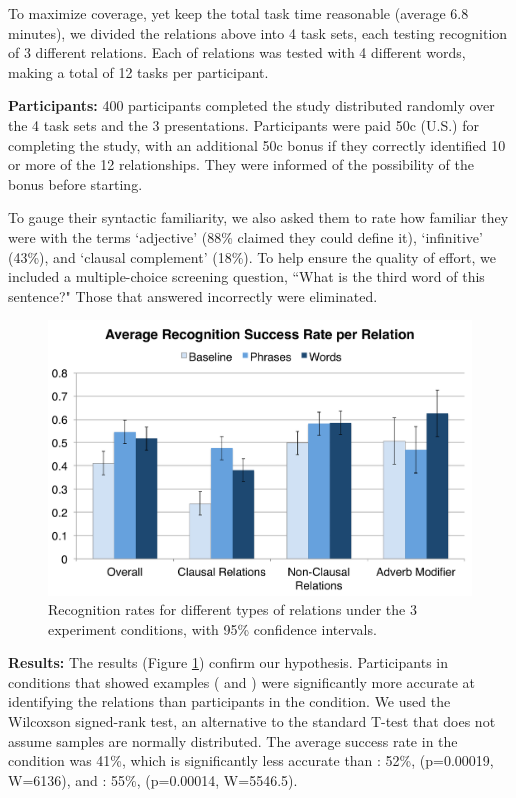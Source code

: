 To maximize coverage, yet keep the total task time reasonable (average 6.8 minutes), we divided the relations above into 4 task sets, each testing recognition of 3 different relations. Each of relations was tested with 4 different words, making a total of 12 tasks per participant.

{\bf Participants:} 400 participants completed the study distributed randomly over the 4 task sets and the 3 presentations. Participants were paid 50c (U.S.) for completing the study, with an additional 50c bonus if they correctly identified 10 or more of the 12 relationships. They were informed of the possibility of the bonus before starting.

 To gauge their syntactic familiarity, we also asked them to rate how familiar they were with the terms `adjective' (88\% claimed they could define it), `infinitive' (43\%), and `clausal complement' (18\%). To help ensure the quality of effort, we included a multiple-choice screening question, ``What is the third word of this sentence?"  Those that answered incorrectly were eliminated.



\begin{figure}
\centering
\includegraphics[width=\columnwidth]{fig/results}
\caption{\label{fig:results} Recognition rates for different types of relations under the 3 experiment conditions, with 95\% confidence intervals.}
\end{figure}

{\bf Results:} The results (Figure \ref{fig:results}) confirm our hypothesis. Participants in conditions that showed examples ( and ) were significantly more accurate at identifying the relations than participants in the  condition. We used the Wilcoxson signed-rank test, an alternative to the standard T-test that does not assume samples are normally distributed. The average success rate in the  condition was 41\%, which is significantly less accurate than : 52\%, (p=0.00019, W=6136), and : 55\%, (p=0.00014, W=5546.5).

